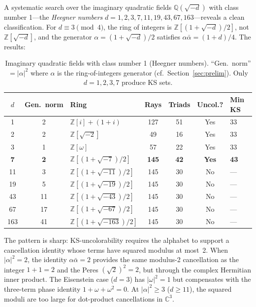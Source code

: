 \documentclass[12pt,a4paper]{article}
\newcommand{\C}{\mathbb{C}}
\newcommand{\Z}{\mathbb{Z}}
\newcommand{\Q}{\mathbb{Q}}
\begin{document}
A systematic search over the imaginary quadratic fields $\Q(\sqrt{-d})$ with class number 1---the \emph{Heegner numbers} $d = 1, 2, 3, 7, 11, 19, 43, 67, 163$---reveals a clean classification. For $d \equiv 3 \pmod{4}$, the ring of integers is $\Z[(1+\sqrt{-d})/2]$, not $\Z[\sqrt{-d}]$, and the generator $\alpha = (1+\sqrt{-d})/2$ satisfies $\alpha\bar\alpha = (1+d)/4$. The results:

\begin{table}[ht]
\centering
\caption{Imaginary quadratic fields with class number 1 (Heegner numbers). ``Gen.\ norm'' $= |\alpha|^2$ where $\alpha$ is the ring-of-integers generator (cf.\ Section~\ref{sec:prelim}). Only $d = 1, 2, 3, 7$ produce KS sets.}
\label{tab:heegner}
\begin{tabular}{cclcccl}
\toprule
$d$ & Gen.\ norm & Ring & Rays & Triads & Uncol.? & Min KS \\
\midrule
1 & 2 & $\Z[i]+(1+i)$ & 127 & 51 & Yes & 33 \\
2 & 2 & $\Z[\sqrt{-2}]$ & 49 & 16 & Yes & 33 \\
3 & 1 & $\Z[\omega]$ & 57 & 22 & Yes & 33 \\
\textbf{7} & \textbf{2} & $\Z[(1+\sqrt{-7})/2]$ & \textbf{145} & \textbf{42} & \textbf{Yes} & \textbf{43} \\
11 & 3 & $\Z[(1+\sqrt{-11})/2]$ & 145 & 30 & No & --- \\
19 & 5 & $\Z[(1+\sqrt{-19})/2]$ & 145 & 30 & No & --- \\
43 & 11 & $\Z[(1+\sqrt{-43})/2]$ & 145 & 30 & No & --- \\
67 & 17 & $\Z[(1+\sqrt{-67})/2]$ & 145 & 30 & No & --- \\
163 & 41 & $\Z[(1+\sqrt{-163})/2]$ & 145 & 30 & No & --- \\
\bottomrule
\end{tabular}
\end{table}

The pattern is sharp: KS-uncolorability requires the alphabet to support a cancellation identity whose terms have squared modulus at most~2. When $|\alpha|^2 = 2$, the identity $\alpha\bar\alpha = 2$ provides the same modulus-2 cancellation as the integer $1+1=2$ and the Peres $(\sqrt{2})^2 = 2$, but through the complex Hermitian inner product. The Eisenstein case ($d = 3$) has $|\omega|^2 = 1$ but compensates with the three-term phase identity $1 + \omega + \omega^2 = 0$. At $|\alpha|^2 \geq 3$ ($d \geq 11$), the squared moduli are too large for dot-product cancellations in $\C^3$.
\end{document}
